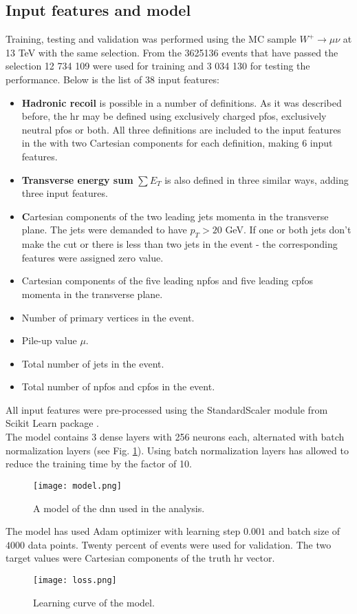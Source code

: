 \subsection{Input features and model}
 Training, testing and validation was performed using the MC sample $W^+\rightarrow\mu\nu$ at 13 TeV with the same selection. From the 3625136 events that have passed the selection 12 734 109 were used for training and 3 034 130 for testing the performance. 
 Below is the list of 38 input features: 
 \begin{itemize}
 \item \textbf{Hadronic recoil} is possible in a number of definitions. As it was described before, the \gls{hr} may be defined using exclusively charged \gls{pfos}, exclusively neutral \gls{pfos} or both. All three definitions are included to the input features in the with two Cartesian components for each definition, making 6 input features. 
 \item \textbf{Transverse energy sum} $\sum E_T$ is also defined in three similar ways, adding three input features.
 \item \textbf Cartesian components of the {two leading jets} momenta in the transverse plane. The jets were demanded to have $p_T>20$ GeV. If one or both jets don't make the cut or there is less than two jets in the event - the corresponding features were assigned zero value. 
 \item Cartesian components of the {five leading \gls{npfos} and five leading \gls{cpfos}} momenta in the transverse plane. 
 \item Number of primary vertices in the event.
 \item Pile-up value $\mu$.
 \item Total number of jets in the event.
 \item Total number of \gls{npfos} and \gls{cpfos} in the event.
\end{itemize}
All input features were pre-processed using the StandardScaler module from Scikit Learn package \cite{scikit-learn}.\\
The model contains 3 dense layers with 256 neurons each, alternated with batch normalization layers (see Fig. \ref{fig::nnmodel}). Using batch normalization layers has allowed to reduce the training time by the factor of 10. 
\begin{figure}[htpb]
	\centering
	\texttt{[image: model.png]}
	\caption{A model of the \gls{dnn} used in the analysis. }
	\label{fig::nnmodel}
\end{figure}
The model has used Adam optimizer with learning step $0.001$ and batch size of $4000$ data points. Twenty percent of events were used for validation. The two target values were Cartesian components of the truth \gls{hr} vector.
\begin{figure}[htpb]
	\centering
	\texttt{[image: loss.png]}
	\caption{Learning curve of the model.}
	\label{fig::nntraining}
\end{figure}
